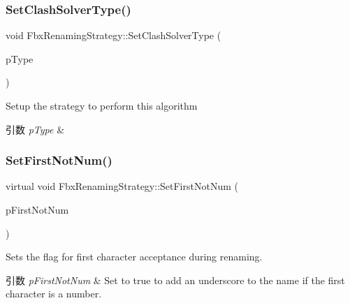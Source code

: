 \subsubsection{\texorpdfstring{Set\+Clash\+Solver\+Type()}{SetClashSolverType()}}
{\footnotesize\ttfamily void Fbx\+Renaming\+Strategy\+::\+Set\+Clash\+Solver\+Type (\begin{DoxyParamCaption}\item[{\hyperlink{class_fbx_renaming_strategy_aacebe214cec13a6cdbbc9e40d16c57dd}{E\+Clash\+Type}}]{p\+Type }\end{DoxyParamCaption})}

Setup the strategy to perform this algorithm 
\begin{DoxyParams}{引数}
{\em p\+Type} & \\
\hline
\end{DoxyParams}
\mbox{\label{class_fbx_renaming_strategy_a0786472d7eeef7b817eb8dacbaebafa6}} 
\subsubsection{\texorpdfstring{Set\+First\+Not\+Num()}{SetFirstNotNum()}}
{\footnotesize\ttfamily virtual void Fbx\+Renaming\+Strategy\+::\+Set\+First\+Not\+Num (\begin{DoxyParamCaption}\item[{bool}]{p\+First\+Not\+Num }\end{DoxyParamCaption})\hspace{0.3cm}{\ttfamily [virtual]}}

Sets the flag for first character acceptance during renaming. 
\begin{DoxyParams}{引数}
{\em p\+First\+Not\+Num} & Set to {\ttfamily true} to add an underscore to the name if the first character is a number. \\
\hline
\end{DoxyParams}
\mbox{\label{class_fbx_renaming_strategy_a7326723f421c3f81a2a2bbaa95f979fe}} 
